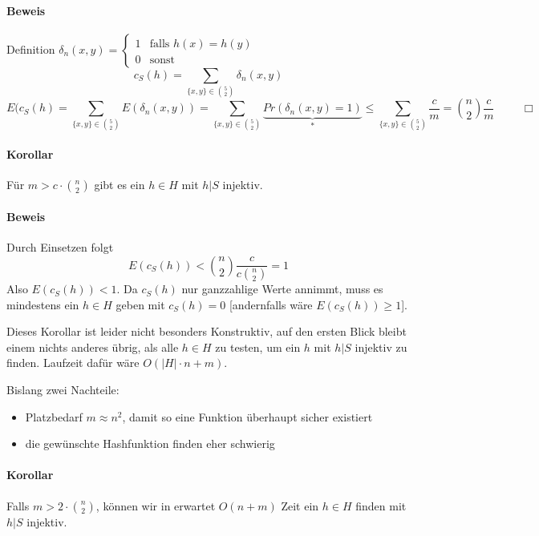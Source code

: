 \paragraph*{Beweis} Definition 
$\delta_n(x,y) = \begin{cases} 1 & \text{falls } h(x)=h(y) \\ 0 & \text{sonst} \end{cases}$
$$ c_S(h)=\sum\limits_{\{ x,y \} \in {5 \choose 2}} \delta_n(x,y) $$
$$ E(c_S(h) = \sum\limits_{\{x,y\} \in {5 \choose 2}} E(\delta_n(x,y)) = \sum\limits_{\{x,y\} \in {5 \choose 2}} \underbrace{Pr(\delta_n(x,y)=1)}_{*} \leq \sum\limits_{\{x,y\} \in {5 \choose 2}} \frac{c}{m} = {n \choose 2} \frac{c}{m} \hspace{1cm} \Box$$

\paragraph*{Korollar} Für $m>c \cdot {n \choose 2}$ gibt es ein $h \in H$ mit $h|S$ injektiv.

\paragraph*{Beweis} Durch Einsetzen folgt $$ E(c_S(h)) < {n \choose 2} \frac{c}{c {n \choose 2}} = 1 $$
Also $E(c_S(h)) < 1$. Da $c_S(h)$ nur ganzzahlige Werte annimmt, muss es mindestens ein $h \in H$ geben mit $c_S(h)=0$ [andernfalls wäre $E(c_S(h)) \geq 1$].

\par\medskip
Dieses Korollar ist leider nicht besonders Konstruktiv, auf den ersten Blick bleibt einem nichts anderes übrig, als alle $h \in H$ zu testen, um ein $h$ mit $h|S$ injektiv zu finden. Laufzeit dafür wäre $O(|H| \cdot n+m)$.\par\medskip

Bislang zwei Nachteile:
\begin{itemize}
	\item Platzbedarf $m \approx n^2$, damit so eine Funktion überhaupt sicher existiert
	\item die gewünschte Hashfunktion finden eher schwierig
\end{itemize}

\paragraph*{Korollar} Falls $m>2 \cdot {n \choose 2}$, können wir in erwartet $O(n+m)$ Zeit ein $h \in H$ finden mit $h|S$ injektiv.


